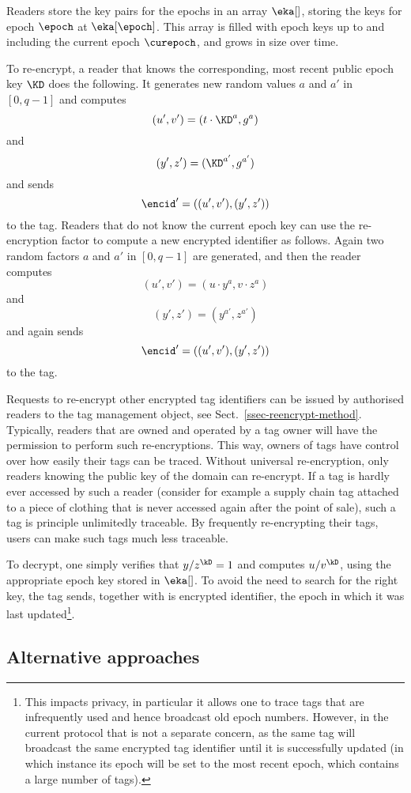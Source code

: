 Readers store the key pairs for the epochs in an array $\eka[]$, storing
the keys for epoch $\epoch$ at $\eka[\epoch]$. This array is filled with epoch
keys up to and including the current epoch $\curepoch$, and grows in size over
time. 

To re-encrypt, a reader that knows the corresponding, most recent public epoch
key $\KD$ does the following. It generates new random
values $a$ and $a'$ in $[0,q-1]$ and computes
\[
(u', v') = (t \cdot \KD^{a} , g^{a})
\]
and
\[
(y',z') = (\KD^{a'} , g^{a'})
\]
and sends
\[
\encid'= ((u',v'),(y',z')) 
\]
to the tag.
Readers that do not know the current epoch key can use the re-encryption 
factor to compute a new encrypted identifier as follows. Again two random
factors $a$ and $a'$ in $[0,q-1]$ are generated, and then the reader computes
\[
(u', v') = (u \cdot y^a, v \cdot z^a )
\]
and
\[
(y',z') = (y^{a'} , z^{a'})
\]
and again sends
\[
\encid'= ((u',v'),(y',z')) 
\]
to the tag.

Requests to re-encrypt other encrypted tag identifiers can be issued by
authorised readers to the tag management object, see
Sect.~\ref{ssec-reencrypt-method}.
Typically, readers that are owned and operated by a tag owner will have the
permission to perform such re-encryptions. This way, owners of tags have
control over how easily their tags can be traced. 
Without universal re-encryption, only readers knowing the public key of the
domain can re-encrypt. If a tag is hardly ever accessed by such a reader
(consider for example a supply chain tag attached to a piece of clothing that
is never accessed again after the point of sale), such a tag is principle
unlimitedly traceable. By frequently re-encrypting
their tags, users can make such tags much less traceable. 

To decrypt, one simply verifies that $y/z^\kD = 1$ and
computes $u/v^\kD$, using the appropriate epoch key
stored in $\eka[]$. To avoid the need to search for the right key, the tag
sends, together with is encrypted identifier, the epoch in which it was last
updated\footnote{This impacts privacy, in particular it allows one to trace 
  tags that are infrequently used and hence broadcast old epoch numbers.
  However, in the current protocol that is not a separate concern, as the same
  tag will broadcast the same encrypted tag identifier until it is successfully 
  updated (in which instance its epoch will be set to the most recent epoch,
  which contains a large number of tags).}.



\subsection{Alternative approaches}

